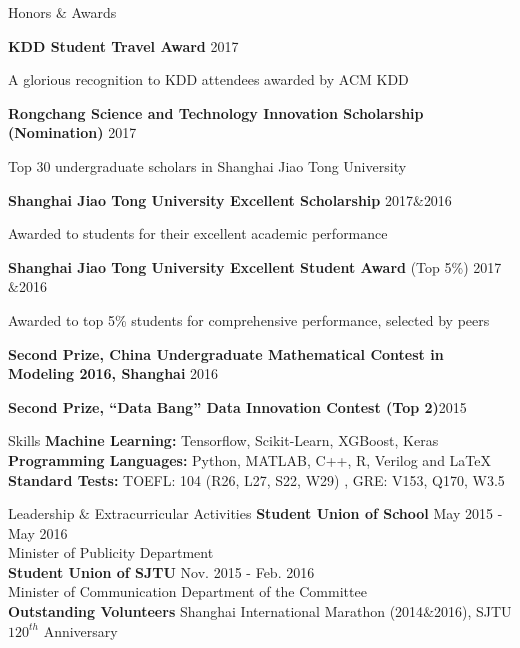 \documentclass{resume} %
\begin{document}
\begin{rSection}{Honors $\&$ Awards}
\begin{rSubsection}{}{}{}{}
\item[] \textbf{KDD Student Travel Award} \hfill{2017}
\item A glorious recognition to KDD attendees awarded by ACM KDD
\item[] \textbf{Rongchang Science and Technology Innovation Scholarship (Nomination)} \hfill{2017}
\item Top 30 undergraduate scholars in Shanghai Jiao Tong University
\item[] \textbf{Shanghai Jiao Tong University Excellent Scholarship} \hfill{2017$\&$2016}
\item Awarded to students for their excellent academic performance
\item[] \textbf{Shanghai Jiao Tong University Excellent Student Award} (Top 5\%)  \hfill{2017$\&$2016}
\item Awarded to top 5\% students for comprehensive performance, selected by peers
\item[] \textbf{Second Prize, China Undergraduate Mathematical Contest in Modeling 2016, Shanghai} \hfill{2016}
\item[] \textbf{Second Prize, ``Data Bang'' Data Innovation Contest (Top 2)}\hfill{2015} 
\end{rSubsection}
\end{rSection}


\begin{rSection}{Skills}
{\bf Machine Learning: }
\hspace*{3.0 cm} Tensorflow, Scikit-Learn, XGBoost, Keras\\
{\bf Programming Languages: }
\hspace*{1.8 cm} Python, MATLAB, C++, R, Verilog and \LaTeX  \\
{\bf Standard Tests: }
\hspace*{3.53 cm} TOEFL: 104 (R26, L27, S22, W29) , GRE: V153, Q170, W3.5
\end{rSection}

\begin{rSection}{Leadership $\&$ Extracurricular Activities}
\textbf{Student Union of School} \hfill{May 2015 - May 2016}\\
Minister of Publicity Department  \\
\textbf{Student Union of SJTU} \hfill{Nov. 2015 - Feb. 2016}\\
Minister of Communication Department of the Committee \\
\textbf{Outstanding Volunteers} \hfill{Shanghai International Marathon (2014$\&$2016), SJTU $120^{th}$ Anniversary}
\end{rSection}
\clearpage
\end{document}
